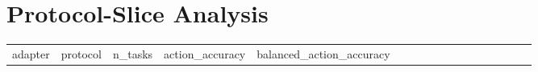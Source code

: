 \section{Protocol-Slice Analysis}\label{protocol-slice-analysis}

{\def\LTcaptype{none} %
\begin{longtable}[]{@{}
  >{\raggedright\arraybackslash}p{}
  >{\raggedright\arraybackslash}p{}
  >{\raggedright\arraybackslash}p{}
  >{\raggedright\arraybackslash}p{}
  >{\raggedright\arraybackslash}p{}
  >{\raggedright\arraybackslash}p{}
  >{\raggedright\arraybackslash}p{}
  >{\raggedright\arraybackslash}p{}
  >{\raggedright\arraybackslash}p{}
  >{\raggedright\arraybackslash}p{}
  >{\raggedright\arraybackslash}p{}
  >{\raggedright\arraybackslash}p{}
  >{\raggedright\arraybackslash}p{}
  >{\raggedright\arraybackslash}p{}
  >{\raggedright\arraybackslash}p{}
  >{\raggedright\arraybackslash}p{}
  >{\raggedright\arraybackslash}p{}@{}}
\toprule\noalign{}
\begin{minipage}[b]{\linewidth}\raggedright
adapter
\end{minipage} & \begin{minipage}[b]{\linewidth}\raggedright
protocol
\end{minipage} & \begin{minipage}[b]{\linewidth}\raggedright
n\_tasks
\end{minipage} & \begin{minipage}[b]{\linewidth}\raggedright
action\_accuracy
\end{minipage} & \begin{minipage}[b]{\linewidth}\raggedright
balanced\_action\_accuracy
\end{minipage} & \begin{minipage}[b]{\linewidth}\raggedright

\end{minipage}
\end{longtable}}
